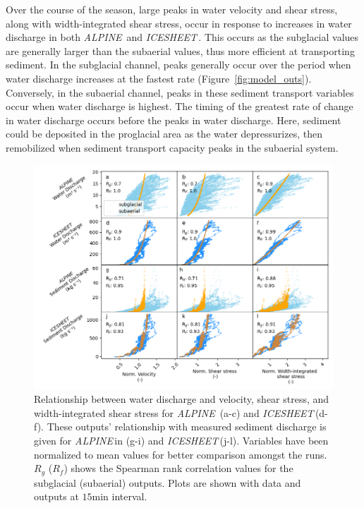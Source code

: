 \documentclass[draft]{agujournal2019}
\newcommand{\alpine}{\textit{ALPINE}\,}
\newcommand{\icesheet}{\textit{ICESHEET}\,}
\newcommand{\unit}[1]{$\mathrm{#1}$}
\begin{document}
Over the course of the season, large peaks in water velocity and shear stress, along with width-integrated shear stress, occur in response to increases in water discharge in both \alpine{} and \icesheet{}.
This occurs as the subglacial values are generally larger than the subaerial values, thus more efficient at transporting sediment.
In the subglacial channel, peaks generally occur over the period when water discharge increases at the fastest rate (Figure~\ref{fig:model_outs}).
Conversely, in the subaerial channel, peaks in these sediment transport variables occur when water discharge is highest.
The timing of the greatest rate of change in water discharge occurs before the peaks in water discharge.
Here, sediment could be deposited in the proglacial area as the water depressurizes, then remobilized when sediment transport capacity peaks in the subaerial system.

\begin{figure}[h]
  \centering
  \includegraphics[width=0.9\linewidth]{Fig3.png}
  \caption{Relationship between water discharge and velocity, shear stress, and width-integrated shear stress for \alpine{} (a-c) and \icesheet (d-f).
    These outputs' relationship with measured sediment discharge is given for \alpine in (g-i) and \icesheet (j-l).
    Variables have been normalized to mean values for better comparison amongst the runs.
    $R_g$ ($R_f$) shows the Spearman rank correlation values for the subglacial (subaerial) outputs.
    Plots are shown with data and outputs at $15$\unit{min} interval.
  }
  \label{fig:Qw_vari}
\end{figure}
\end{document}
